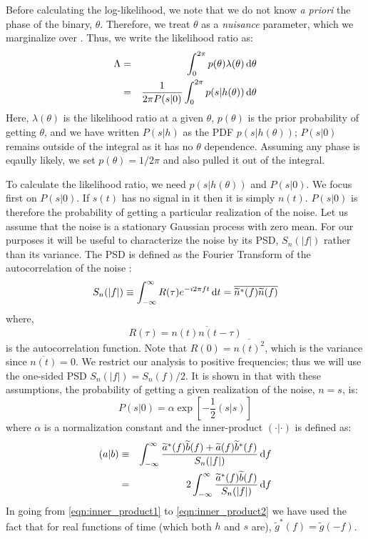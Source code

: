 Before calculating the log-likelihood, we note that we do not know \emph{a priori} the phase of the binary, $\theta$. Therefore, we treat $\theta$ as a \emph{nuisance} parameter, which we marginalize over \cite{ref:Sivia}. Thus, we write the likelihood ratio as:
\begin{eqnarray}
\Lambda & = & \int_0^{2 \pi} p(\theta) \lambda(\theta) \,\mathrm{d}\theta \nonumber \\
 & = & \frac{1}{2\pi P(s|0)} \int_0^{2 \pi} p(s|h(\theta)) \,\mathrm{d}\theta
\end{eqnarray}
Here, $\lambda(\theta)$ is the likelihood ratio at a given $\theta$, $p(\theta)$ is the prior probability of getting $\theta$, and we have written $P(s|h)$ as the \ac{PDF} $p(s|h(\theta))$; $P(s|0)$ remains outside of the integral as it has no $\theta$ dependence. Assuming any phase is eqaully likely, we set $p(\theta) = 1/2\pi$ and also pulled it out of the integral.

To calculate the likelihood ratio, we need $p(s|h(\theta))$ and $P(s|0)$. We focus first on $P(s|0)$. If $s(t)$ has no signal in it then it is simply $n(t)$. $P(s|0)$ is therefore the probability of getting a particular realization of the noise. Let us assume that the noise is a stationary Gaussian process with zero mean. For our purposes it will be useful to characterize the noise by its \ac{PSD}, $S_n(|f|)$ rather than its variance. The \ac{PSD} is defined as the Fourier Transform of the autocorrelation of the noise \cite{ref:Wainstein_Zubakov}:
\begin{equation}
S_n(|f|) \equiv \int_{-\infty}^{\infty} R(\tau)e^{-i 2\pi ft} \,\mathrm{d} t = \overline{\widetilde{n}^{*}(f)\widetilde{n}(f)}
\end{equation}
where,
\begin{equation}
R(\tau) = \overline{n(t)n(t-\tau)}
\end{equation}
is the autocorrelation function. Note that $R(0) = \overline{n(t)^2}$, which is the variance since $\overline{n(t)} = 0$. We restrict our analysis to positive frequencies; thus we will use the one-sided \ac{PSD} $S_n(|f|) = S_n(f)/2$. It is shown in \cite{ref:Finn} that with these assumptions, the probability of getting a given realization of the noise, $n = s$, is:
\begin{equation}
\label{eqn:p_no_sig}
P(s|0) = \alpha \exp[ - \frac{1}{2} (s|s) ]
\end{equation}
where $\alpha$ is a normalization constant and the inner-product $(\cdot|\cdot)$ is defined as:
\begin{eqnarray}
\label{eqn:inner_product1}
(a|b) & \equiv & \int_{-\infty}^{\infty} \frac{ \widetilde{a}^{*}(f)\widetilde{b}(f) + \widetilde{a}(f)\widetilde{b}^{*}(f) }{S_n(|f|)} \d f \\
\label{eqn:inner_product2}
 & = & 2 \int_{-\infty}^{\infty} \frac{ \widetilde{a}^{*}(f)\widetilde{b}(f) }{S_n(|f|)} \d f
\end{eqnarray}
In going from \ref{eqn:inner_product1} to \ref{eqn:inner_product2} we have used the fact that for real functions of time (which both $h$ and $s$ are), $\widetilde{g}^{*}(f) = \widetilde{g}(-f)$.

